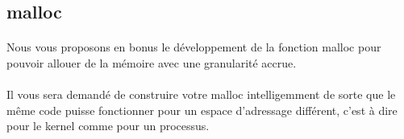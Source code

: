 \documentclass[10pt,a4wide]{article}
\begin{document}
\subsection{malloc}

\paragraph{}

Nous vous proposons en bonus le d\'eveloppement de la fonction malloc
pour pouvoir allouer de la m\'emoire avec une granularit\'e accrue.

\paragraph{}

Il vous sera demand\'e de construire votre malloc intelligemment de sorte
que le m\^eme code puisse fonctionner pour un espace d'adressage diff\'erent,
c'est \`a dire pour le kernel comme pour un processus.
\end{document}

